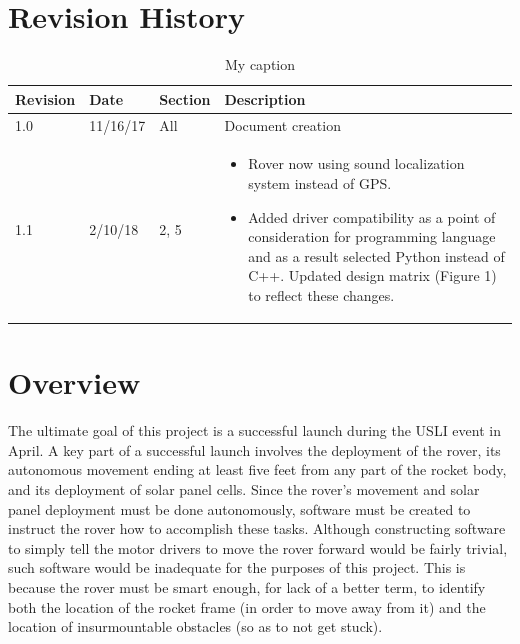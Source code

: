 \documentclass[onecolumn, draftclsnofoot,10pt, compsoc]{IEEEtran}
\begin{document}
\section{Revision History}
\begin{table}[h]
\centering
\caption{My caption}
\label{my-label}
\begin{tabular}{@{}lllp{12cm}@{}}
\toprule
\textbf{Revision}    & \textbf{Date}            & \textbf{Section}  & \textbf{Description}                                                                                                                                             \\ \midrule
1.0                  & 11/16/17                  & All               & Document creation                                                                                                                                                \\ \midrule
1.1 & 2/10/18 & 2, 5 & \vspace{-15pt} \begin{itemize} \item Rover now using sound localization system instead of GPS. \item Added driver compatibility as a point of consideration for programming language and as a result selected Python instead of C++. Updated design matrix (Figure 1) to reflect these changes. \end{itemize} \vspace{-15pt} \\ \bottomrule
\end{tabular}
\end{table}
\section{Overview}
The ultimate goal of this project is a successful launch during the USLI event in April. A key part of a successful launch involves the deployment of the rover, its autonomous movement ending at least five feet from any part of the rocket body, and its deployment of solar panel cells. Since the rover's movement and solar panel deployment must be done autonomously, software must be created to instruct the rover how to accomplish these tasks. Although constructing software to simply tell the motor drivers to move the rover forward would be fairly trivial, such software would be inadequate for the purposes of this project. This is because the rover must be smart enough, for lack of a better term, to identify both the location of the rocket frame (in order to move away from it) and the location of insurmountable obstacles (so as to not get stuck). 
\end{document}
